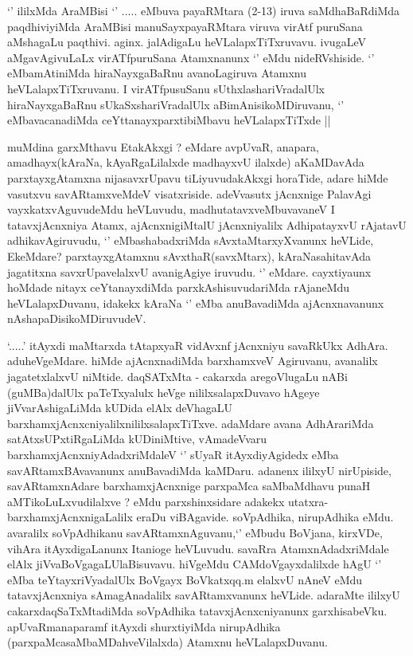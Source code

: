 \begin{center}


\end{center}

\begin{artha}
`\stext' ililxMda AraMBisi `\stext' ..... eMbuva payaRMtara (2-13) iruva saMdhaBaRdiMda paqdhiviyiMda AraMBisi manuSayxpayaRMtara viruva virAtf puruSana aMshagaLu paqthivi. aginx. jalAdigaLu heVLalapxTiTxruvavu. ivugaLeV aMgavAgivuLaLx virATfpuruSana Atamxnanunx `\stext' eMdu nideRVshiside. `\stext' eMbamAtiniMda hiraNayxgaBaRnu avanoLagiruva Atamxnu heVLalapxTiTxruvanu. I virATfpusuSanu sUthxlashariVradalUlx hiraNayxgaBaRnu sUkaSxshariVradalUlx aBimAnisikoMDiruvanu, `\stext' eMbavacanadiMda ceYttanayxparxtibiMbavu heVLalapxTiTxde ||
\end{artha}

\begin{artha}
 muMdina garxMthavu EtakAkxgi ? eMdare avpUvaR, anapara, amadhayx(kAraNa, kAyaRgaLilalxde madhayxvU ilalxde) aKaMDavAda parxtayxgAtamxna nijasavxrUpavu tiLiyuvudakAkxgi horaTide, adare hiMde vasutxvu savARtamxveMdeV visatxriside. adeVvasutx jAcnxnige PalavAgi vayxkatxvAguvudeMdu heVLuvudu, madhutatavxveMbuvavaneV I tatavxjAcnxniya Atamx, ajAcnxnigiMtalU jAcnxniyalilx AdhipatayxvU rAjatavU adhikavAgiruvudu, `\stext' eMbashabadxriMda sAvxtaMtarxyXvanunx heVLide, EkeMdare? parxtayxgAtamxnu sAvxthaR(savxMtarx), kAraNasahitavAda jagatitxna savxrUpavelalxvU avanigAgiye iruvudu. 
 `\stext' eMdare. cayxtiyaunx hoMdade nitayx ceYtanayxdiMda parxkAshisuvudariMda rAjaneMdu heVLalapxDuvanu, idakekx kAraNa `\stext' eMba anuBavadiMda ajAcnxnavanunx nAshapaDisikoMDiruvudeV.
\end{artha}

\begin{artha}
`\stext.....' itAyxdi maMtarxda tAtapxyaR vidAvxnf jAcnxniyu savaRkUkx AdhAra. aduheVgeMdare. hiMde ajAcnxnadiMda barxhamxveV Agiruvanu, avanalilx jagatetxlalxvU niMtide. daqSATxMta - cakarxda aregoVlugaLu nABi (guMBa)dalUlx paTeTxyalulx heVge nililxsalapxDuvavo hAgeye jiVvarAshigaLiMda kUDida elAlx deVhagaLU barxhamxjAcnxcniyalilxnililxsalapxTiTxve. adaMdare avana AdhArariMda satAtxsUPxtiRgaLiMda kUDiniMtive, vAmadeVvaru barxhamxjAcnxniyAdadxriMdaleV `\stext' sUyaR itAyxdiyAgidedx eMba savARtamxBAvavanunx anuBavadiMda kaMDaru. adanenx ililxyU nirUpiside, savARtamxnAdare barxhamxjAcnxnige parxpaMca saMbaMdhavu punaH aMTikoLuLxvudilalxve ? eMdu parxshinxsidare adakekx utatxra- barxhamxjAcnxnigaLalilx eraDu viBAgavide. soVpAdhika, nirupAdhika eMdu. avaralilx soVpAdhikanu savARtamxnAguvanu,`\stext' eMbudu BoVjana, kirxVDe, vihAra itAyxdigaLanunx Itanioge heVLuvudu. savaRra AtamxnAdadxriMdale elAlx jiVvaBoVgagaLUlaBisuvavu. hiVgeMdu CAMdoVgayxdalilxde hAgU `\stext' eMba teYtayxriVyadalUlx BoVgayx BoVkatxqq.m elalxvU nAneV eMdu tatavxjAcnxniya sAmagAnadalilx savARtamxvanunx heVLide. adaraMte ililxyU cakarxdaqSaTxMtadiMda soVpAdhika tatavxjAcnxcniyanunx garxhisabeVku. apUvaRmanaparamf itAyxdi shurxtiyiMda nirupAdhika (parxpaMcasaMbaMDahveVilalxda) Atamxnu heVLalapxDuvanu.
\end{artha}

